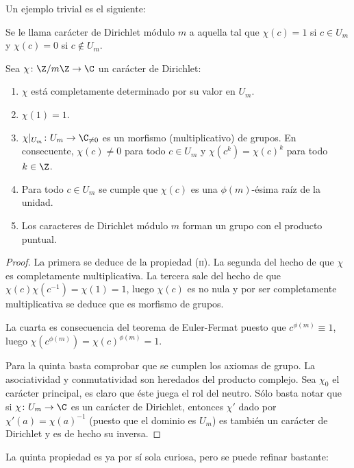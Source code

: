 \documentclass[teoria-numeros.tex]{subfiles}
\begin{document}
Un ejemplo trivial es el siguiente:
\begin{mydef}
	Se le llama carácter  de Dirichlet módulo $m$ a aquella tal que $\chi(c) = 1$ si $c \in U_m$ y $\chi(c) = 0$ si $c \notin U_m$.
\end{mydef}

\begin{prop}
	Sea $\chi\colon \Z/m\Z \to \C$ un carácter de Dirichlet:
	\begin{enumerate}
		\item $\chi$ está completamente determinado por su valor en $U_m$.
		\item $\chi(1) = 1$.
		\item $\chi|_{U_m}\colon U_m \to \C_{\ne 0}$ es un morfismo (multiplicativo) de grupos.
			En consecuente, $\chi(c) \ne 0$ para todo $c\in U_m$ y $\chi(c^k) = \chi(c)^k$ para todo $k\in\Z$.
		\item Para todo $c\in U_m$ se cumple que $\chi(c)$ es una $\phi(m)$-ésima raíz de la unidad.
		\item Los caracteres de Dirichlet módulo $m$ forman un grupo con el producto puntual.
	\end{enumerate}
\end{prop}
\begin{proof}
	La primera se deduce de la propiedad \textsc{(ii)}. La segunda del hecho de que $\chi$ es completamente multiplicativa.
	La tercera sale del hecho de que $\chi(c)\chi(c^{-1}) = \chi(1) = 1$, luego $\chi(c)$ es no nula y por ser completamente multiplicativa
	se deduce que es morfismo de grupos.

	La cuarta es consecuencia del teorema de Euler-Fermat
	puesto que $c^{\phi(m)} \equiv 1$, luego $\chi(c^{\phi(m)}) = \chi(c)^{\phi(m)} = 1$.

	Para la quinta basta comprobar que se cumplen los axiomas de grupo.
	La asociatividad y conmutatividad son heredados del producto complejo.
	Sea $\chi_0$ el carácter principal, es claro que éste juega el rol del neutro.
	Sólo basta notar que si $\chi\colon U_m \to \C$ es un carácter de Dirichlet,
	entonces $\chi'$ dado por $\chi'(a) = \chi(a)^{-1}$ (puesto que el dominio es $U_m$) es también un carácter de Dirichlet y es de hecho su inversa.
\end{proof}
La quinta propiedad es ya por sí sola curiosa, pero se puede refinar bastante:
\end{document}
